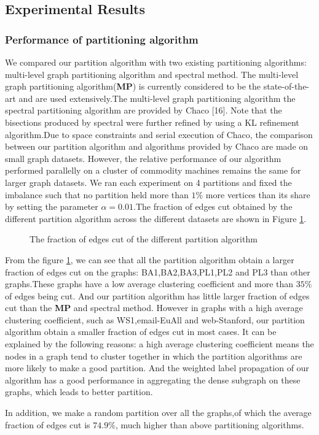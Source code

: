 \documentclass{acm_proc_article-sp}
\begin{document}
\subsection{Experimental Results}
\subsubsection{Performance of partitioning algorithm}
We compared our partition algorithm with two existing partitioning algorithms: multi-level graph partitioning algorithm and spectral method.
The multi-level graph partitioning algorithm(\textbf{MP}) is currently considered to be the state-of-the-art and are used extensively.The multi-level graph partitioning algorithm the spectral partitioning algorithm are provided by Chaco [16]. Note that the bisections produced by spectral were further refined by using a KL refinement algorithm.Due to space constraints and serial execution of Chaco, the comparison between our partition algorithm and algorithms provided by Chaco are made on small graph datasets. However, the relative performance of our algorithm performed parallelly on a cluster of commodity machines remains the same for larger graph datasets. We ran each experiment on 4 partitions and fixed the imbalance such that no partition held more than $1\%$ more vertices than its share by setting the parameter $\alpha=0.01$.The fraction of edges cut obtained by the different partition algorithm across the different datasets  are shown in Figure \ref{fig:per}.
\begin{figure}
\centering
{}
\caption{The fraction of edges cut of the different partition algorithm}
\label{fig:per}
\end{figure}
\par
From the figure \ref{fig:per}, we can see that all the partition algorithm obtain a larger fraction of edges cut on the graphs: BA1,BA2,BA3,PL1,PL2 and PL3 than other graphs.These graphs have a low average clustering coefficient and more than $35\%$ of edges being cut. And our partition algorithm has little larger fraction of edges cut than the \textbf{MP} and spectral method. However in graphs with a high average clustering coefficient, such as WS1,email-EuAll and web-Stanford, our partition algorithm obtain a smaller fraction of edges cut in most cases. It can be explained by the following reasons: a high average clustering coefficient means the nodes in a graph tend to cluster together in which the partition algorithms are more likely to make a good partition. And the weighted label propagation of our algorithm has a good performance in aggregating the dense subgraph on these graphs, which leads to better partition.
\par
In addition, we make a random partition over all the graphs,of which the average fraction of edges cut is $74.9\%$, much higher than above partitioning algorithms.
\end{document}
